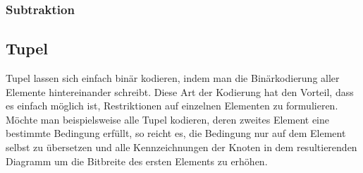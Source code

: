 \subsubsection{Subtraktion}


\subsection{Tupel}
Tupel lassen sich einfach binär kodieren, indem man die Binärkodierung aller Elemente hintereinander schreibt.
Diese Art der Kodierung hat den Vorteil, dass es einfach möglich ist, Restriktionen auf einzelnen Elementen zu formulieren.
Möchte man beispielsweise alle Tupel kodieren, deren zweites Element eine bestimmte Bedingung erfüllt, so reicht es, die Bedingung nur auf dem Element selbst zu übersetzen und alle Kennzeichnungen der Knoten in dem resultierenden Diagramm um die Bitbreite des ersten Elements zu erhöhen.